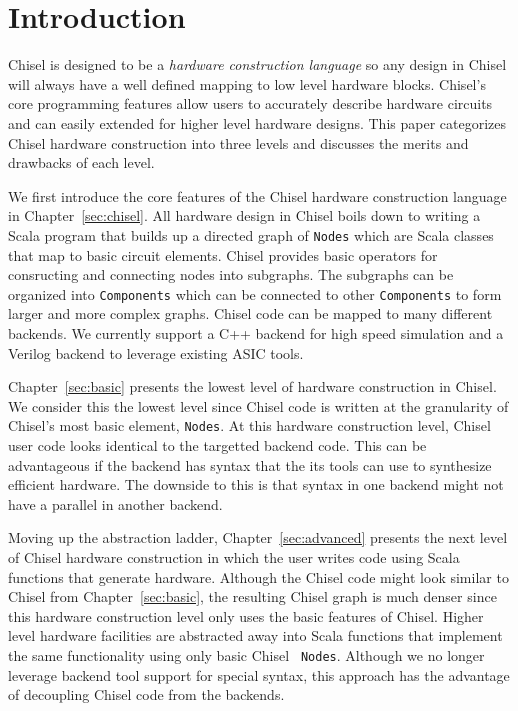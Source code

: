 \section{Introduction}
\label{sec:intro}
Chisel is designed to be a {\it hardware construction language} so any
design in Chisel will always have a well defined mapping to low level
hardware blocks. Chisel's core programming features allow users to
accurately describe hardware circuits and can easily extended for
higher level hardware designs. This paper categorizes Chisel hardware
construction into three levels and discusses the merits and drawbacks
of each level.

We first introduce the core features of the Chisel hardware
construction language in Chapter~\ref{sec:chisel}. All hardware design
in Chisel boils down to writing a Scala program that builds up a directed
graph of {\tt Nodes} which are Scala classes that map to basic circuit
elements. Chisel provides basic operators for consructing and
connecting nodes into subgraphs. The subgraphs can be organized into
{\tt Components} which can be connected to other {\tt Components} to
form larger and more complex graphs. Chisel code can be mapped to many
different backends. We currently support a C++ backend for high speed
simulation and a Verilog backend to leverage existing ASIC tools.

Chapter~\ref{sec:basic} presents the lowest level of hardware
construction in Chisel. We consider this the lowest level since
Chisel code is written at the granularity of Chisel's most basic
element, {\tt Nodes}. At this hardware construction level, Chisel user
code looks identical to the targetted backend code. This can be
advantageous if the backend has syntax that the its tools can use to
synthesize efficient hardware. The downside to this is that syntax in
one backend might not have a parallel in another backend.

Moving up the abstraction ladder, Chapter~\ref{sec:advanced} presents
the next level of Chisel hardware construction in which the user
writes code using Scala functions that generate hardware. Although the
Chisel code might look similar to Chisel from Chapter~\ref{sec:basic},
the resulting Chisel graph is much denser since this hardware
construction level only uses the basic features of Chisel. Higher
level hardware facilities are abstracted away into Scala functions that
implement the same functionality using only basic Chisel {\tt
  Nodes}. Although we no longer leverage backend tool support for
special syntax, this approach has the advantage of decoupling Chisel
code from the backends.

